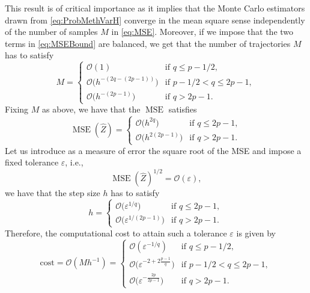 \documentclass{siamart1116}
\numberwithin{theorem}{section}
\newcommand{\OO}{\mathcal{O}}
\newcommand{\epl}{\varepsilon}
\newcommand{\MSE}{\operatorname{MSE}}
\newcommand{\corr}[1]{{\color{bordeaux}#1}}
\begin{document}
\begin{remark} This result is of critical importance as it implies that the Monte Carlo estimators drawn from \eqref{eq:ProbMethVarH} converge in the mean square sense independently of the number of samples $M$ in \eqref{eq:MSE}. Moreover, if we impose that the two terms in \eqref{eq:MSEBound} are balanced, we get that the number of trajectories $M$ has to satisfy
	\corr{\begin{equation}
		M = \begin{cases} 
			\OO(1) & \mbox{if } q \leq p - 1/2, \\
			\OO\big(h^{-(2q - (2p-1))}\big) & \mbox{if } p-1/2 < q \leq 2p - 1, \\
			\OO\big(h^{-(2p-1)}\big) & \mbox{if } q > 2p - 1.
		\end{cases}
	\end{equation}}
	Fixing $M$ as above, we have that the $\MSE$ satisfies 
	\begin{equation}
		\MSE(\hat Z) = \begin{cases} 
					   \OO\big(h^{2q}\big) & \mbox{if } q \leq 2p - 1, \\
					   \OO\big(h^{2(2p - 1)}\big) & \mbox{if } q > 2p - 1.
					   \end{cases}
	\end{equation}
	Let us introduce as a measure of error the square root of the MSE and impose a fixed tolerance $\epl$, i.e.,
	\begin{equation}
		\MSE(\hat Z)^{1/2} = \OO(\epl),
	\end{equation}
	we have that the step size $h$ has to satisfy
	\begin{equation}
		h = \begin{cases} 
			\OO\big(\epl^{1 / q}\big) & \mbox{if } q \leq 2p - 1, \\
			\OO\big(\epl^{1 / (2p - 1)}\big) & \mbox{if } q > 2p - 1.
			\end{cases}
	\end{equation}
	Therefore, the computational cost to attain such a tolerance $\epl$ is given by
	\begin{equation}
		\mathrm{cost} = \OO(Mh^{-1}) = \begin{cases} 
										   \OO(\epl^{-1/q}) & \mbox{if } q \leq p - 1/2, \\
										   \OO\big(\epl^{-2 + 2 \frac{p - 1}{q}}\big) & \mbox{if } p-1/2 < q \leq 2p - 1, \\
										   \OO\big(\epl^{-\frac{2p}{2p - 1}}\big) & \mbox{if } q > 2p - 1.
									   \end{cases}
	\end{equation}
\end{remark} 
\end{document}
